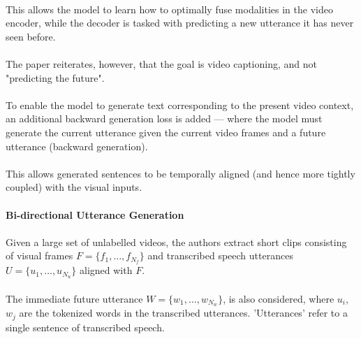 \documentclass{article}
\begin{document}
\paragraph{}This allows the model to learn how to optimally fuse modalities in the video encoder,
while the decoder is tasked with predicting a new utterance it has never seen before.

\paragraph{}The paper reiterates, however, that the goal is video captioning, and not "predicting
the future".

\paragraph{}To enable the model to generate text corresponding to the present video context, an
additional backward generation loss is added --- where the model must generate the current utterance given the 
current video frames and a future utterance (backward generation).

\paragraph{}This allows generated sentences to be temporally aligned (and hence more tightly coupled) with 
the visual inputs.

\paragraph{Bi-directional Utterance Generation}

\paragraph{}Given a large set of unlabelled videos, the authors extract short clips
consisting of visual frames $F = \{f_1 ,\ldots, f_{N_f}\}$ and transcribed speech utterances
$U = \{u_1, \ldots, u_{N_u}\}$ aligned with $F$.

\paragraph{}The immediate future utterance $W = \{w_1, \ldots, w_{N_w}\}$, is also considered,
where $u_i$, $w_j$ are the tokenized words in the transcribed utterances. 'Utterances' refer
to a single sentence of transcribed speech.
\end{document}

